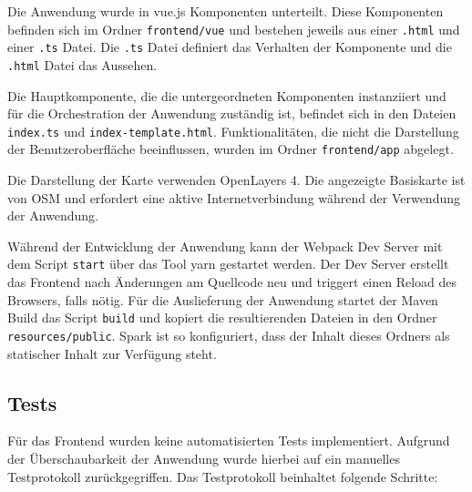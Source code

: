 \documentclass[
ngerman          %
,a4paper          %
,11pt
,pdftex
]{report}
\begin{document}
Die Anwendung wurde in vue.js Komponenten unterteilt. Diese Komponenten befinden sich im Ordner \texttt{frontend/vue} und bestehen jeweils aus einer \texttt{.html} und einer \texttt{.ts} Datei. Die \texttt{.ts} Datei definiert das Verhalten der Komponente und die \texttt{.html} Datei das Aussehen.

Die Hauptkomponente, die die untergeordneten Komponenten instanziiert und für die Orchestration der Anwendung zuständig ist, befindet sich in den Dateien \texttt{index.ts} und \texttt{index-template.html}. Funktionalitäten, die nicht die Darstellung der Benutzeroberfläche beeinflussen, wurden im Ordner \texttt{frontend/app} abgelegt.

Die Darstellung der Karte verwenden OpenLayers 4. Die angezeigte Basiskarte ist von \ac{OSM} und erfordert eine aktive Internetverbindung während der Verwendung der Anwendung.

Während der Entwicklung der Anwendung kann der Webpack Dev Server mit dem Script \texttt{start} über das Tool yarn gestartet werden. Der Dev Server erstellt das Frontend nach Änderungen am Quellcode neu und triggert einen Reload des Browsers, falls nötig. Für die Auslieferung der Anwendung startet der Maven Build das Script \texttt{build} und kopiert die resultierenden Dateien in den Ordner \texttt{resources/public}. Spark ist so konfiguriert, dass der Inhalt dieses Ordners als statischer Inhalt zur Verfügung steht.

\subsection{Tests}

Für das Frontend wurden keine automatisierten Tests implementiert. Aufgrund der Überschaubarkeit der Anwendung wurde hierbei auf ein manuelles Testprotokoll zurückgegriffen. Das Testprotokoll beinhaltet folgende Schritte:
\end{document}
